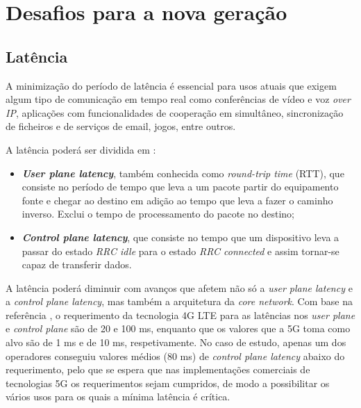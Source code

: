 \documentclass{llncs}
\begin{document}
\section{Desafios para a nova geração}

\subsection{Latência}
A minimização do período de latência é essencial para usos atuais que exigem algum tipo de comunicação em tempo real como conferências de vídeo e voz \textit{over IP}, aplicações com funcionalidades de cooperação em simultâneo, sincronização de ficheiros e de serviços de email, jogos, entre outros.

A latência poderá ser dividida em :
\begin{itemize}
	\item \textit{\textbf{User plane latency}}, também conhecida como \textit{round-trip time} (RTT), que consiste no período de tempo que leva a um pacote partir do equipamento fonte e chegar ao destino em adição ao tempo que leva a fazer o caminho inverso. Exclui o tempo de processamento do pacote no destino;
	\item \textit{\textbf{Control plane latency}}, que consiste no tempo que um dispositivo leva a passar do estado \textit{RRC idle} para o estado \textit{RRC connected} e assim tornar-se capaz de transferir dados.
\end{itemize}

A latência poderá diminuir com avanços que afetem não só a \textit{user plane latency} e a \textit{control plane latency}, mas também a arquitetura da \textit{core network}. Com base na referência \cite{magazine}, o requerimento da tecnologia 4G LTE para as latências nos \textit{user plane} e \textit{control plane} são de 20 e 100 ms, enquanto que os valores que a 5G toma como alvo são de 1 ms e de 10 ms, respetivamente. No caso de estudo, apenas um dos operadores conseguiu valores médios (80 ms) de \textit{control plane latency} abaixo do requerimento, pelo que se espera que nas implementações comerciais de tecnologias 5G os requerimentos sejam cumpridos, de modo a possibilitar os vários usos para os quais a mínima latência é crítica.
\end{document}
